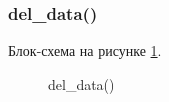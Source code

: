 \subsubsection{del\_data()}

Блок-схема на рисунке \ref{fig:del_data}.

\begin{figure}[p]
    \caption{del\_data()}
    \label{fig:del_data}
\end{figure}





\newpage